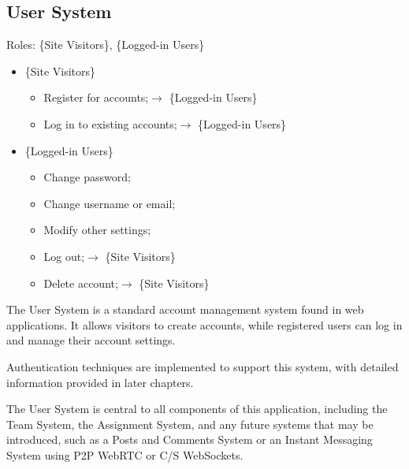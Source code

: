 \documentclass[12pt]{report}
\newcommand{\n}{\par}
\newcommand{\br}{\n\vspace{1 em}\n}
\begin{document}
\subsection{User System} \label{overview.project-objectives.user-system}
Roles: \{Site Visitors\}, \{Logged-in Users\}\n
\begin{itemize}
	\item \{Site Visitors\}
	      \begin{itemize}
		      \item Register for accounts;\null\hfill $\rightarrow$ \{Logged-in Users\}
		      \item Log in to existing accounts;\null\hfill $\rightarrow$ \{Logged-in Users\}
	      \end{itemize}
	\item \{Logged-in Users\}
	      \begin{itemize}
		      \item Change password;
		      \item Change username or email;
		      \item Modify other settings;
		      \item Log out;\null\hfill $\rightarrow$ \{Site Visitors\}
		      \item Delete account;\null\hfill $\rightarrow$ \{Site Visitors\}
	      \end{itemize}
\end{itemize}\n
The User System is a standard account management system found in web applications.
It allows visitors to create accounts, while registered users can log in and manage their account settings.
\br
Authentication techniques are implemented to support this system, with detailed information provided in later chapters.
\br
The User System is central to all components of this application,
including the Team System, the Assignment System, and any future systems that may be introduced,
such as a Posts and Comments System or an Instant Messaging System using P2P WebRTC or C/S WebSockets.
\end{document}
